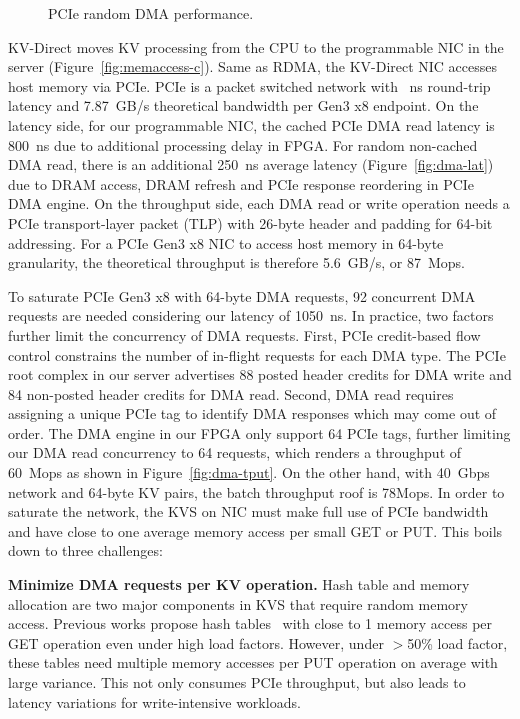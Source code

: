 \begin{figure}[t]
\centering
{}
\caption{PCIe random DMA performance.}
\label{fig:dma-perf}
\vspace{-10pt}
\end{figure}

KV-Direct moves KV processing from the CPU to the programmable NIC in the server (Figure~\ref{fig:memaccess-c}).
Same as RDMA, the KV-Direct NIC accesses host memory via PCIe. PCIe is a packet switched network with ~ns round-trip latency and 7.87~GB/s theoretical bandwidth per Gen3 x8 endpoint.
On the latency side, for our programmable NIC, the cached PCIe DMA read latency is 800~ns due to additional processing delay in FPGA.
For random non-cached DMA read, there is an additional 250~ns average latency (Figure~\ref{fig:dma-lat}) due to DRAM access, DRAM refresh and PCIe response reordering in PCIe DMA engine.
On the throughput side, each DMA read or write operation needs a PCIe transport-layer packet (TLP) with 26-byte header and padding for 64-bit addressing.
For a PCIe Gen3 x8 NIC to access host memory in 64-byte granularity, the theoretical throughput is therefore 5.6~GB/s, or 87~Mops.

To saturate PCIe Gen3 x8 with 64-byte DMA requests, 92 concurrent DMA requests are needed considering our latency of 1050~ns.
In practice, two factors further limit the concurrency of DMA requests.
First, PCIe credit-based flow control constrains the number of in-flight requests for each DMA type. The PCIe root complex in our server advertises 88 posted header credits for DMA write and 84 non-posted header credits for DMA read.
Second, DMA read requires assigning a unique PCIe tag to identify DMA responses which may come out of order.
The DMA engine in our FPGA only support 64 PCIe tags, further limiting our DMA read concurrency to 64 requests, which renders a throughput of 60~Mops as shown in Figure~\ref{fig:dma-tput}.
On the other hand, with 40~Gbps network and 64-byte KV pairs, the batch throughput roof is 78Mops.
In order to saturate the network, the KVS on NIC must make full use of PCIe bandwidth and have close to one average memory access per small GET or PUT.
This boils down to three challenges:

\textbf{Minimize DMA requests per KV operation.}
Hash table and memory allocation are two major components in KVS that require random memory access.
Previous works propose hash tables~\cite{dragojevic2014farm, breslow2016horton} with close to 1 memory access per GET operation even under high load factors.
However, under $>$50\% load factor, these tables need multiple memory accesses per PUT operation on average with large variance.
This not only consumes PCIe throughput, but also leads to latency variations for write-intensive workloads.

